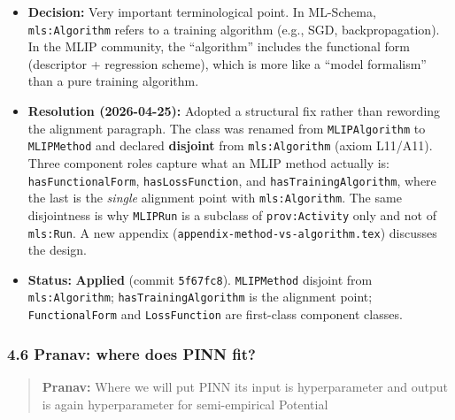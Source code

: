 \begin{itemize}
\tightlist
\item
  \textbf{Decision:} Very important terminological point. In ML-Schema, \texttt{mls:Algorithm} refers to a training algorithm (e.g., SGD, backpropagation). In the MLIP community, the ``algorithm'' includes the functional form (descriptor + regression scheme), which is more like a ``model formalism'' than a pure training algorithm.
\item
  \textbf{Resolution (2026-04-25):} Adopted a structural fix rather than rewording the alignment paragraph. The class was renamed from \texttt{MLIPAlgorithm} to \texttt{MLIPMethod} and declared \textbf{disjoint} from \texttt{mls:Algorithm} (axiom L11/A11). Three component roles capture what an MLIP method actually is: \texttt{hasFunctionalForm}, \texttt{hasLossFunction}, and \texttt{hasTrainingAlgorithm}, where the last is the \emph{single} alignment point with \texttt{mls:Algorithm}. The same disjointness is why \texttt{MLIPRun} is a subclass of \texttt{prov:Activity} only and not of \texttt{mls:Run}. A new appendix (\texttt{appendix-method-vs-algorithm.tex}) discusses the design.
\item
  \textbf{Status:} {\color{green!60!black}\faCheckCircle} \textbf{Applied} (commit \texttt{5f67fc8}). \texttt{MLIPMethod} disjoint from \texttt{mls:Algorithm}; \texttt{hasTrainingAlgorithm} is the alignment point; \texttt{FunctionalForm} and \texttt{LossFunction} are first-class component classes.
\end{itemize}

\subsubsection{4.6 Pranav: where does PINN fit?}\label{pranav-where-does-pinn-fit}

\begin{quote}
\textbf{Pranav:} Where we will put PINN its input is hyperparameter and output is again hyperparameter for semi-empirical Potential
\end{quote}

